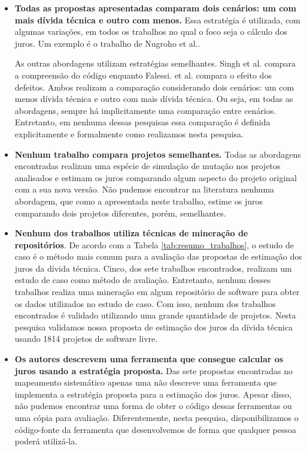 \begin{itemize}

\item \textbf{Todas as propostas apresentadas comparam dois cenários: um com mais dívida técnica e outro com menos.} Essa estratégia é utilizada, com algumas variações, em todos os trabalhos no qual o foco seja o cálculo dos juros. Um exemplo é o trabalho de Nugroho et al.\cite{nugroho2011empirical}. 

As outras abordagens utilizam estratégias semelhantes. Singh et al.\cite{singh2014framework} compara a compreensão do código enquanto Falessi. et al. \cite{falessi2015towards} compara o efeito dos defeitos. Ambos realizam a comparação considerando dois cenários: um com menos dívida técnica e outro com mais dívida técnica. Ou seja, em todas as abordagens, sempre há implicitamente uma comparação entre cenários. Entretanto, em nenhuma dessas pesquisas essa comparação é definida explicitamente e formalmente como realizamos nesta pesquisa. 


\item \textbf{Nenhum trabalho compara projetos semelhantes.} Todas as abordagens encontradas realizam uma espécie de simulação de mutação nos projetos analisados e estimam os juros comparando algum aspecto do projeto original com a sua nova versão. Não pudemos encontrar na literatura nenhuma abordagem, que como a apresentada neste trabalho, estime os juros comparando dois projetos diferentes, porém, semelhantes. 

\item \textbf{Nenhum dos trabalhos utiliza técnicas de mineração de repositórios}.  De acordo com a Tabela \ref{tab:resumo_trabalhos}, o estudo de caso é o método mais comum para a avaliação das propostas de estimação dos juros da dívida técnica. Cinco, dos sete trabalhos encontrados, realizam um estudo de caso como método de avaliação. Entretanto, nenhum desses trabalhos realiza uma mineração em algum repositório de software para obter os dados utilizados no estudo de caso. Com isso, nenhum dos trabalhos encontrados é validado utilizando uma grande quantidade de projetos. Nesta pesquisa validamos nossa proposta de estimação dos juros da dívida técnica usando 1814 projetos de software livre. 
\item \textbf{Os autores descrevem uma ferramenta que consegue calcular os juros usando a estratégia proposta.} Das sete propostas encontradas no mapeamento sistemático apenas uma não descreve uma ferramenta que implementa a estratégia proposta para a estimação dos juros. Apesar disso, não pudemos encontrar uma forma de obter o código dessas ferramentas ou uma cópia para avaliação. Diferentemente, nesta pesquisa, disponibilizamos o código-fonte da ferramenta que desenvolvemos de forma que qualquer pessoa poderá utilizá-la.
 

\end{itemize}
